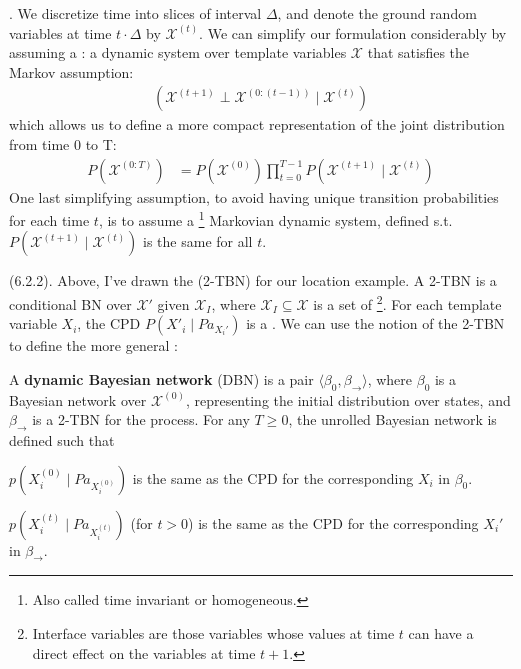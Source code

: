 \documentclass[11pt]{article}
\newcommand\myspace[1][]{\vspace{#1\bigskipamount}}
\newcommand\p{\Needspace{10\baselineskip} \noindent}
\begin{document}
\p {}. We discretize time into slices of interval $\Delta$, and denote the ground random variables at time $t \cdot \Delta$ by $\mathcal{X}^{(t)}$. We can simplify our formulation considerably by assuming a : a dynamic system over template variables $\mathcal X$ that satisfies the Markov assumption:
\begin{align}
	(\mathcal{X}^{(t + 1)} \perp \mathcal{X}^{(0:(t-1))} \mid \mathcal{X}^{(t)}) \label{markovian-assumption}
\end{align}
which allows us to define a more compact representation of the joint distribution from time 0 to T:
\begin{align}
	P(\mathcal{X}^{(0:T)}) &= P(\mathcal{X}^{(0)}) \prod_{t = 0}^{T - 1} P(\mathcal{X}^{(t + 1)}  \mid \mathcal{X}^{(t)} ) 
\end{align}
One last simplifying assumption, to avoid having unique transition probabilities for each time $t$, is to assume a \footnote{Also called time invariant or homogeneous.} Markovian dynamic system, defined s.t. $P(\mathcal{X}^{(t + 1)} \mid \mathcal{X}^{(t)})$ is the same for all $t$.



\myspace
\p {} (6.2.2). Above, I've drawn the  (2-TBN) for our location example. A 2-TBN is a conditional BN over $\mathcal{X}'$ given $\mathcal{X}_I$, where $\mathcal{X}_I \subseteq \mathcal{X}$ is a set of \footnote{Interface variables are those variables whose values at time $t$ can have a direct effect on the variables at time $t+1$.}. For each template variable $X_i$, the CPD $P(X'_i \mid Pa_{X_i'})$ is a . We can use the notion of the 2-TBN to define the more general :
\begin{definition}
	A \textbf{dynamic Bayesian network} (DBN) is a pair $\langle \beta_0, \beta_{\rightarrow} \rangle$, where $\beta_0$ is a Bayesian network over $\mathcal{X}^{(0)}$, representing the initial distribution over states, and $\beta_{\rightarrow}$ is a 2-TBN for the process. For any $T \ge 0$, the unrolled Bayesian network is defined such that
	\begin{compactitem}
		\item $p(X_i^{(0)} \mid Pa_{X_i^{(0)}})$ is the same as the CPD for the corresponding $X_i$ in $\beta_0$.
		\item $p(X_i^{(t)} \mid Pa_{X_i^{(t)}})$ (for $t > 0$) is the same as the CPD for the corresponding $X_i'$ in $\beta_{\rightarrow}$.  
	\end{compactitem}
\end{definition}
\end{document}
